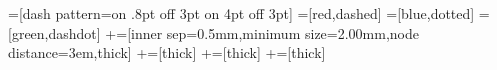 =[dash pattern=on .8pt off 3pt on 4pt off 3pt]
=[red,dashed]
=[blue,dotted]
=[green,dashdot]
+=[inner sep=0.5mm,minimum size=2.00mm,node distance=3em,thick]
+=[thick]
+=[thick]
+=[thick]
\usetikzlibrary{svg.path,calc,decorations.pathreplacing,positioning,backgrounds}
\newdimen\XCoord
\newdimen\YCoord
\newcommand*{\ExtractCoordinate}[1]{\path #1; \pgfgetlastxy{\XCoord}{\YCoord};}%

\newcommand{\drawedges}[2][\empty]{
	\foreach \a/\b in {#2}{
		\draw[#1] (\a) edge (\b);
	}
}

\newcommand{\semicircle}[2]{%
  \ExtractCoordinate{($ 0.5*($ (#2.north) - (#1.north) $) $)}
  \draw[thick] ($ (#2.north) $) arc (0:180:\XCoord);
}